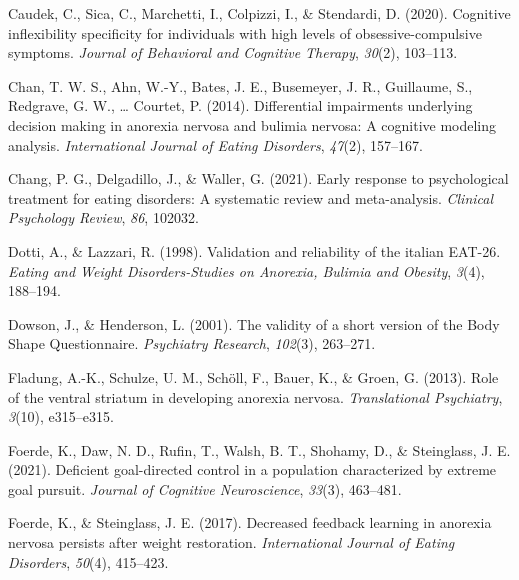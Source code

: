 \documentclass[
  man,floatsintext]{apa6}
\newlength{\cslhangindent}
\newlength{\cslentryspacingunit} %
\newenvironment{CSLReferences}[2] %
 {%
  \setlength{\parindent}{0pt}
  \ifodd #1
  \let\oldpar\par
  \def\par{\hangindent=\cslhangindent\oldpar}
  \fi
  \setlength{\parskip}{#2\cslentryspacingunit}
 }%
 {}
\begin{document}
\begin{CSLReferences}{1}{0}
\leavevmode{}%
Caudek, C., Sica, C., Marchetti, I., Colpizzi, I., \& Stendardi, D. (2020). Cognitive inflexibility specificity for individuals with high levels of obsessive-compulsive symptoms. \emph{Journal of Behavioral and Cognitive Therapy}, \emph{30}(2), 103--113.

\leavevmode{}%
Chan, T. W. S., Ahn, W.-Y., Bates, J. E., Busemeyer, J. R., Guillaume, S., Redgrave, G. W., \ldots{} Courtet, P. (2014). Differential impairments underlying decision making in anorexia nervosa and bulimia nervosa: A cognitive modeling analysis. \emph{International Journal of Eating Disorders}, \emph{47}(2), 157--167.

\leavevmode{}%
Chang, P. G., Delgadillo, J., \& Waller, G. (2021). Early response to psychological treatment for eating disorders: A systematic review and meta-analysis. \emph{Clinical Psychology Review}, \emph{86}, 102032.

\leavevmode{}%
Dotti, A., \& Lazzari, R. (1998). Validation and reliability of the italian {EAT-26}. \emph{Eating and Weight Disorders-Studies on Anorexia, Bulimia and Obesity}, \emph{3}(4), 188--194.

\leavevmode{}%
Dowson, J., \& Henderson, L. (2001). The validity of a short version of the {Body Shape Questionnaire}. \emph{Psychiatry Research}, \emph{102}(3), 263--271.

\leavevmode{}%
Fladung, A.-K., Schulze, U. M., Schöll, F., Bauer, K., \& Groen, G. (2013). Role of the ventral striatum in developing anorexia nervosa. \emph{Translational Psychiatry}, \emph{3}(10), e315--e315.

\leavevmode{}%
Foerde, K., Daw, N. D., Rufin, T., Walsh, B. T., Shohamy, D., \& Steinglass, J. E. (2021). Deficient goal-directed control in a population characterized by extreme goal pursuit. \emph{Journal of Cognitive Neuroscience}, \emph{33}(3), 463--481.

\leavevmode{}%
Foerde, K., \& Steinglass, J. E. (2017). Decreased feedback learning in anorexia nervosa persists after weight restoration. \emph{International Journal of Eating Disorders}, \emph{50}(4), 415--423.


\end{CSLReferences}
\end{document}
